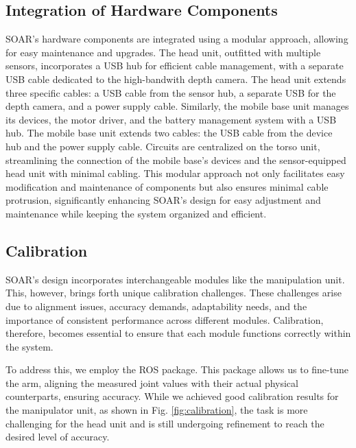 \documentclass[runningheads,a4paper]{llncs}
\begin{document}
\subsection{Integration of Hardware Components}
SOAR's hardware components are integrated using a modular approach, allowing for easy maintenance and upgrades.
The head unit, outfitted with multiple sensors, incorporates a USB hub for efficient cable management, with a separate USB cable dedicated to the high-bandwith depth camera.
The head unit extends three specific cables: a USB cable from the sensor hub, a separate USB for the depth camera, and a power supply cable.
Similarly, the mobile base unit manages its devices, the motor driver, and the battery management system with a USB hub.
The mobile base unit extends two cables: the USB cable from the device hub and the power supply cable.
Circuits are centralized on the torso unit, streamlining the connection of the mobile base's devices and the sensor-equipped head unit with minimal cabling.
This modular approach not only facilitates easy modification and maintenance of components but also ensures minimal cable protrusion, significantly enhancing SOAR's design for easy adjustment and maintenance while keeping the system organized and efficient.

\subsection{Calibration}
SOAR’s design incorporates interchangeable modules like the manipulation unit.
This, however, brings forth unique calibration challenges.
These challenges arise due to alignment issues, accuracy demands, adaptability needs, and the importance of consistent performance across different modules.
Calibration, therefore, becomes essential to ensure that each module functions correctly within the system.

To address this, we employ the \cite{ferguson2015robust} ROS package.
This package allows us to fine-tune the arm, aligning the measured joint values with their actual physical counterparts, ensuring accuracy.
While we achieved good calibration results for the manipulator unit, as shown in Fig. \ref{fig:calibration}, the task is more challenging for the head unit and is still undergoing refinement to reach the desired level of accuracy.
\end{document}
